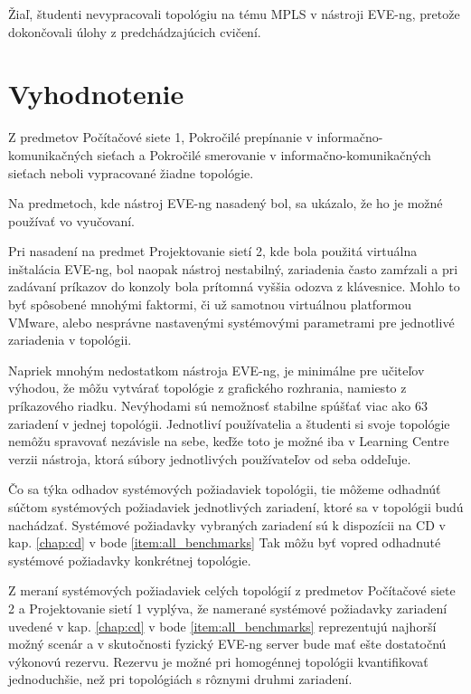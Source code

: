 Žiaľ, študenti nevypracovali topológiu na tému MPLS v nástroji EVE-ng, pretože dokončovali úlohy z predchádzajúcich cvičení.




\section{Vyhodnotenie}

Z predmetov Počítačové siete 1, Pokročilé prepínanie v informačno-komunikačných sieťach a Pokročilé smerovanie v informačno-komunikačných sieťach neboli vypracované žiadne topológie.

Na predmetoch, kde nástroj EVE-ng nasadený bol, sa ukázalo, že ho je možné používať vo vyučovaní.

Pri nasadení na predmet Projektovanie sietí 2, kde bola použitá virtuálna inštalácia EVE-ng, bol naopak nástroj nestabilný, zariadenia často zamŕzali a pri zadávaní príkazov do konzoly bola prítomná vyššia odozva z klávesnice. Mohlo to byť spôsobené mnohými faktormi, či už samotnou virtuálnou platformou VMware, alebo nesprávne nastavenými systémovými parametrami pre jednotlivé zariadenia v topológii.

Napriek mnohým nedostatkom nástroja EVE-ng, je minimálne pre učiteľov výhodou, že môžu vytvárať topológie z grafického rozhrania, namiesto z príkazového riadku. Nevýhodami sú nemožnosť stabilne spúšťať viac ako 63 zariadení v jednej topológii. Jednotliví používatelia a študenti si svoje topológie nemôžu spravovať nezávisle na sebe, keďže toto je možné iba v Learning Centre verzii nástroja, ktorá súbory jednotlivých používateľov od seba oddeľuje.

Čo sa týka odhadov systémových požiadaviek topológii, tie môžeme odhadnúť súčtom systémových požiadaviek jednotlivých zariadení, ktoré sa v topológii budú nachádzať. Systémové požiadavky vybraných zariadení sú k dispozícii na CD v kap. \ref{chap:cd} v bode \ref{item:all_benchmarks} Tak môžu byť vopred odhadnuté systémové požiadavky konkrétnej topológie.

Z meraní systémových požiadaviek celých topológií z predmetov Počítačové siete 2 a Projektovanie sietí 1 vyplýva, že namerané systémové požiadavky zariadení uvedené v kap. \ref{chap:cd} v bode \ref{item:all_benchmarks} reprezentujú najhorší možný scenár a v skutočnosti fyzický EVE-ng server bude mať ešte dostatočnú výkonovú rezervu. Rezervu je možné pri homogénnej topológii kvantifikovať jednoduchšie, než pri topológiách s rôznymi druhmi zariadení.